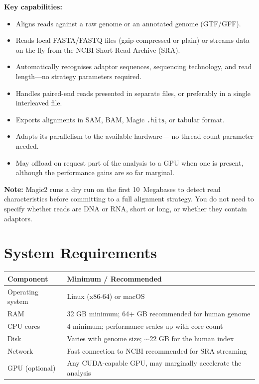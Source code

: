 \documentclass[11pt]{article}
\newcommand{\code}[1]{\texttt{#1}}
\begin{document}
\textbf{Key capabilities:}
\begin{itemize}
\item Aligns reads against a raw genome or an annotated genome (GTF/GFF).
\item Reads local FASTA/FASTQ files (gzip-compressed or plain) or streams
  data on the fly from the NCBI Short Read Archive (SRA).
\item Automatically recognises adaptor
  sequences, sequencing technology, and read length---no strategy
  parameters required.
\item Handles paired-end reads presented in separate files, or
  preferably in a single interleaved file.
\item Exports alignments in SAM, BAM, Magic \code{.hits}, or tabular format.
\item Adapts its parallelism to the available hardware--- no thread count
  parameter needed.
\item May offload on request part of the analysis to a GPU when one is present,
  although the performance gains are so far marginal.
\end{itemize}

\begin{notebox}
\textbf{Note:} Magic2 runs a dry run on the first 10~Megabases to detect
read characteristics before committing to a full alignment strategy.
You do not need to specify whether reads are DNA or RNA, short or long,
or whether they contain adaptors.
\end{notebox}

\section{System Requirements}

\begin{center}
\begin{tabular}{ll}
\toprule
\textbf{Component} & \textbf{Minimum / Recommended} \\
\midrule
Operating system & Linux (x86-64) or macOS \\
RAM              & 32 GB minimum; 64+ GB recommended for human genome \\
CPU cores        & 4 minimum; performance scales up with core count \\
Disk             & Varies with genome size; \(\sim\)22 GB for the human index \\
Network          & Fast connection to NCBI recommended for SRA streaming \\
GPU (optional)   & Any CUDA-capable GPU, may marginally accelerate the analysis \\
\bottomrule
\end{tabular}
\end{center}
\end{document}
